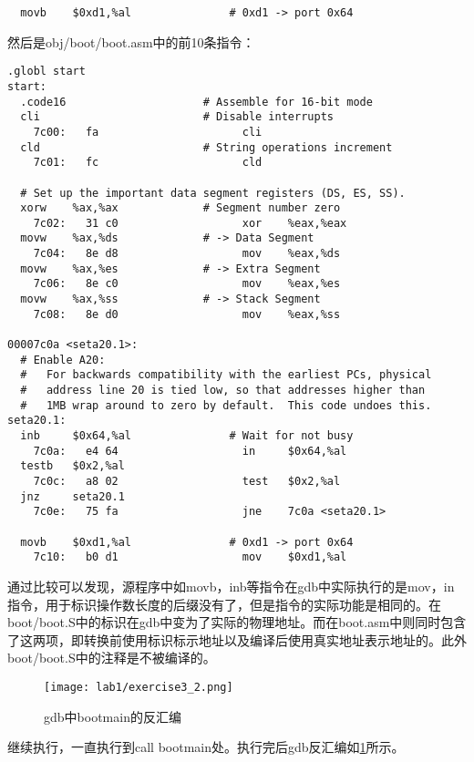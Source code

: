 \begin{exerciseSolution}{3}
\begin{lstlisting}
  movb    $0xd1,%al               # 0xd1 -> port 0x64
\end{lstlisting}

\par 然后是obj/boot/boot.asm中的前10条指令：
\begin{lstlisting}
.globl start
start:
  .code16                     # Assemble for 16-bit mode
  cli                         # Disable interrupts
    7c00:	fa                   	cli
  cld                         # String operations increment
    7c01:	fc                   	cld

  # Set up the important data segment registers (DS, ES, SS).
  xorw    %ax,%ax             # Segment number zero
    7c02:	31 c0                	xor    %eax,%eax
  movw    %ax,%ds             # -> Data Segment
    7c04:	8e d8                	mov    %eax,%ds
  movw    %ax,%es             # -> Extra Segment
    7c06:	8e c0                	mov    %eax,%es
  movw    %ax,%ss             # -> Stack Segment
    7c08:	8e d0                	mov    %eax,%ss

00007c0a <seta20.1>:
  # Enable A20:
  #   For backwards compatibility with the earliest PCs, physical
  #   address line 20 is tied low, so that addresses higher than
  #   1MB wrap around to zero by default.  This code undoes this.
seta20.1:
  inb     $0x64,%al               # Wait for not busy
    7c0a:	e4 64                	in     $0x64,%al
  testb   $0x2,%al
    7c0c:	a8 02                	test   $0x2,%al
  jnz     seta20.1
    7c0e:	75 fa                	jne    7c0a <seta20.1>

  movb    $0xd1,%al               # 0xd1 -> port 0x64
    7c10:	b0 d1                	mov    $0xd1,%al
\end{lstlisting}
\par 通过比较可以发现，源程序中如movb，inb等指令在gdb中实际执行的是mov，in指令，用于标识操作数长度的后缀没有了，但是指令的实际功能是相同的。在boot/boot.S中的标识在gdb中变为了实际的物理地址。而在boot.asm中则同时包含了这两项，即转换前使用标识标示地址以及编译后使用真实地址表示地址的。此外boot/boot.S中的注释是不被编译的。

\begin{figure}[htb]
    \centering
    \texttt{[image: lab1/exercise3\_2.png]}
    \caption{gdb中bootmain的反汇编}
    \label{fig:exercise3_2}
\end{figure}
\par 继续执行，一直执行到call bootmain处。执行完后gdb反汇编如\ref{fig:exercise3_2}所示。


\end{exerciseSolution}
